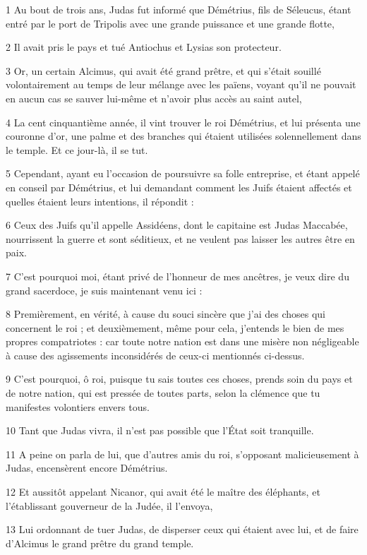 
\par 1 Au bout de trois ans, Judas fut informé que Démétrius, fils de Séleucus, étant entré par le port de Tripolis avec une grande puissance et une grande flotte,
\par 2 Il avait pris le pays et tué Antiochus et Lysias son protecteur.
\par 3 Or, un certain Alcimus, qui avait été grand prêtre, et qui s'était souillé volontairement au temps de leur mélange avec les païens, voyant qu'il ne pouvait en aucun cas se sauver lui-même et n'avoir plus accès au saint autel,
\par 4 La cent cinquantième année, il vint trouver le roi Démétrius, et lui présenta une couronne d'or, une palme et des branches qui étaient utilisées solennellement dans le temple. Et ce jour-là, il se tut.
\par 5 Cependant, ayant eu l'occasion de poursuivre sa folle entreprise, et étant appelé en conseil par Démétrius, et lui demandant comment les Juifs étaient affectés et quelles étaient leurs intentions, il répondit :
\par 6 Ceux des Juifs qu'il appelle Assidéens, dont le capitaine est Judas Maccabée, nourrissent la guerre et sont séditieux, et ne veulent pas laisser les autres être en paix.
\par 7 C'est pourquoi moi, étant privé de l'honneur de mes ancêtres, je veux dire du grand sacerdoce, je suis maintenant venu ici :
\par 8 Premièrement, en vérité, à cause du souci sincère que j'ai des choses qui concernent le roi ; et deuxièmement, même pour cela, j'entends le bien de mes propres compatriotes : car toute notre nation est dans une misère non négligeable à cause des agissements inconsidérés de ceux-ci mentionnés ci-dessus.
\par 9 C'est pourquoi, ô roi, puisque tu sais toutes ces choses, prends soin du pays et de notre nation, qui est pressée de toutes parts, selon la clémence que tu manifestes volontiers envers tous.
\par 10 Tant que Judas vivra, il n'est pas possible que l'État soit tranquille.
\par 11 A peine on parla de lui, que d'autres amis du roi, s'opposant malicieusement à Judas, encensèrent encore Démétrius.
\par 12 Et aussitôt appelant Nicanor, qui avait été le maître des éléphants, et l'établissant gouverneur de la Judée, il l'envoya,
\par 13 Lui ordonnant de tuer Judas, de disperser ceux qui étaient avec lui, et de faire d'Alcimus le grand prêtre du grand temple.
